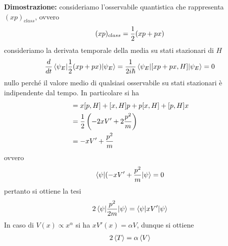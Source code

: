 \documentclass{article}
\begin{document}
\textbf{Dimostrazione:} consideriamo l'osservabile quantistica che rappresenta $(xp)_{class}$, ovvero
\begin{gather}
    (xp)_{class} = \frac{1}{2}(xp + px) \notag
\end{gather}
consideriamo la derivata temporale della media su stati stazionari di $H$
\begin{gather}
    \frac{d}{dt}\braket{\psi_E|\frac{1}{2}(xp + px)|\psi_E} = \frac{1}{2i\hbar}\braket{\psi_E|[xp + px, H]|\psi_E} = 0 \notag
\end{gather}
nullo perché il valore medio di qualsiasi osservabile su stati stazionari è indipendente dal tempo. In particolare si ha
\begin{align}
    [xp + px, H] &= x[p, H] + [x, H]p + p[x, H] + [p, H]x \notag \\
    &= \frac{1}{2}\left( -2xV' + 2\frac{p^2}{m} \right) \notag \\
    &= -xV' + \frac{p^2}{m} \notag
\end{align}
ovvero
\begin{gather}
    \braket{\psi|(-xV' + \frac{p^2}{m}|\psi} = 0 \notag
\end{gather}
pertanto si ottiene la tesi
\begin{gather}
    2\braket{\psi|\frac{p^2}{2m}|\psi} = \braket{\psi|xV'|\psi} \notag
\end{gather}
In caso di $V(x) \propto x^\alpha$ si ha $xV'(x) = \alpha V$, dunque si ottiene
\begin{gather}
    2\braket{T} = \alpha\braket{V} \notag
\end{gather}

\newpage
\end{document}
